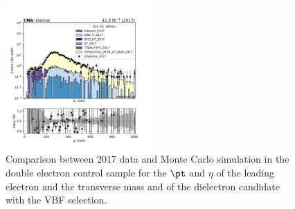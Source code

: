 \begin{figure}[htbp]
\begin{center}
        \includegraphics[width=0.49\textwidth]{fig/datamc/cr_2e_vbf/cr_2e_vbf_dielectron_pt_losf_2017.pdf}
    \end{center}
    \caption{Comparison between 2017 data and Monte Carlo simulation in the double electron control sample for
        the $\pt$ and $\eta$ of the leading electron and the transverse mass and \pt of the dielectron candidate with the VBF selection.}
    \label{fig:DE_2_vbfhinv_2017}
\end{figure}

